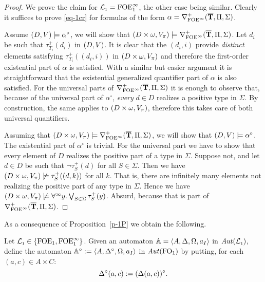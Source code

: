 \begin{proof}
We prove the claim for $\mathcal{L}_{\scriptscriptstyle 1}={\mathrm{FOE}^{\infty}_1}$, the other case being similar.
Clearly it suffices to prove \eqref{eq-1cr} for formulas of the form
$\alpha = \nabla^+_{{\mathrm{FOE}}^\infty}(\overline{{\mathbf{T}}},\Pi,\Sigma)$.
\smallskip

\noindent\fbox{$\Rightarrow$} 
Assume $(D,V) \models \alpha^{\circ}$, we will show that 
$(D\times \omega,V_\pi) \models \nabla^+_{{\mathrm{FOE}}^\infty}(\overline{{\mathbf{T}}},\Pi,\Sigma)$.
Let $d_i$ be such that $\tau_{T_i}^+(d_i)$ in $(D,V)$. 
It is clear that the $(d_i,i)$ provide \emph{distinct} elements satisfying 
$\tau_{T_i}^+((d_i,i))$ in $(D\times\omega,V_{\pi})$ and therefore the 
first-order existential part of $\alpha$ is satisfied. 
With a similar but easier argument it is straightforward that the existential 
generalized quantifier part of $\alpha$ is also satisfied.
For the universal parts of $\nabla^+_{{\mathrm{FOE}}^\infty}(\overline{{\mathbf{T}}},\Pi,\Sigma)$ it is enough
to observe that, because of the universal part of $\alpha^\circ$, \emph{every}
$d\in D$ realizes a positive type in $\Sigma$. 
By construction, the same applies to $(D\times\omega,V_{\pi})$, 
therefore this takes care of both universal quantifiers.
\medskip
		
\noindent\fbox{$\Leftarrow$} 
Assuming that $(D\times \omega,V_\pi) \models 
\nabla^+_{{\mathrm{FOE}}^\infty}(\overline{{\mathbf{T}}},\Pi,\Sigma)$,
we will show that $(D,V) \models \alpha^\circ$. 
The existential part of $\alpha^{\circ}$ is trivial. 
For the universal part we have to show that every element of $D$ realizes the 
positive part of a type in $\Sigma$. 
Suppose not, and let $d\in D$ be such that $\lnot\tau_S^+(d)$ for all $S\in 
\Sigma$. 
Then we have $(D\times\omega,V_\pi) \not\models \tau_S^+((d,k))$ for all $k$.
That is, there are infinitely many elements not realizing the positive part of 
any type in $\Sigma$. 
Hence we have $(D\times\omega,V_\pi) \not\models \forall^\infty y.\bigvee_{S\in\Sigma} 
\tau_S^+(y)$. 
Absurd, because that is part of $\nabla^+_{{\mathrm{FOE}}^\infty}(\overline{{\mathbf{T}}},\Pi,\Sigma)$.
\end{proof}

As a consequence of Proposition~\ref{p-1P} we obtain the following.

\begin{definition}
Let $\mathcal{L}_{\scriptscriptstyle 1}\in \{{\mathrm{FOE}_1},{\mathrm{FOE}^{\infty}_1}\}$.
Given an automaton $\mathbb{A} = \langle{A,\Delta,\Omega,a_{I}}\rangle$ in $\mathit{Aut}(\mathcal{L}_{\scriptscriptstyle 1})$, define 
the automaton $\mathbb{A}^{\circ} \mathrel{: =} \langle{A,\Delta^{\circ},\Omega,a_{I}}\rangle$ in 
$\mathit{Aut}(\mathrm{FO}_1)$ by putting, for each $(a,c) \in A \times C$:
\[
\Delta^{\circ}(a,c) \mathrel{: =} (\Delta(a,c))^{\circ}.
\]
\end{definition}

